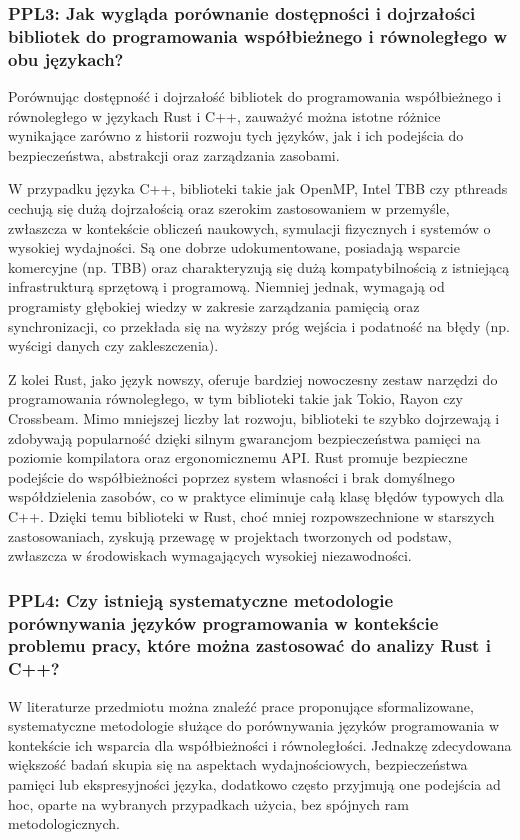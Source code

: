 \subsubsection{PPL3: Jak wygląda porównanie dostępności i dojrzałości bibliotek do programowania współbieżnego i równoległego w obu językach?}
Porównując dostępność i dojrzałość bibliotek do programowania współbieżnego i równoległego w językach Rust i C++, zauważyć można istotne różnice wynikające zarówno z historii rozwoju tych języków, jak i ich podejścia do bezpieczeństwa, abstrakcji oraz zarządzania zasobami.

W przypadku języka C++, biblioteki takie jak OpenMP, Intel TBB czy pthreads cechują się dużą dojrzałością oraz szerokim zastosowaniem w przemyśle, zwłaszcza w kontekście obliczeń naukowych, symulacji fizycznych i systemów o wysokiej wydajności. Są one dobrze udokumentowane, posiadają wsparcie komercyjne (np. TBB) oraz charakteryzują się dużą kompatybilnością z istniejącą infrastrukturą sprzętową i programową. Niemniej jednak, wymagają od programisty głębokiej wiedzy w zakresie zarządzania pamięcią oraz synchronizacji, co przekłada się na wyższy próg wejścia i podatność na błędy (np. wyścigi danych czy zakleszczenia).

Z kolei Rust, jako język nowszy, oferuje bardziej nowoczesny zestaw narzędzi do programowania równoległego, w tym biblioteki takie jak Tokio, Rayon czy Crossbeam. Mimo mniejszej liczby lat rozwoju, biblioteki te szybko dojrzewają i zdobywają popularność dzięki silnym gwarancjom bezpieczeństwa pamięci na poziomie kompilatora oraz ergonomicznemu API. Rust promuje bezpieczne podejście do współbieżności poprzez system własności  i brak domyślnego współdzielenia zasobów, co w praktyce eliminuje całą klasę błędów typowych dla C++. Dzięki temu biblioteki w Rust, choć mniej rozpowszechnione w starszych zastosowaniach, zyskują przewagę w projektach tworzonych od podstaw, zwłaszcza w środowiskach wymagających wysokiej niezawodności.

\subsubsection{PPL4: Czy istnieją systematyczne metodologie porównywania języków programowania w kontekście problemu pracy, które można zastosować do analizy Rust i C++?}

W literaturze przedmiotu można znaleźć prace proponujące sformalizowane, systematyczne metodologie służące do porównywania języków programowania w kontekście ich wsparcia dla współbieżności i równoległości. Jednakzę zdecydowana większość badań skupia się na aspektach wydajnościowych, bezpieczeństwa pamięci lub ekspresyjności języka, dodatkowo często przyjmują one podejścia ad hoc, oparte na wybranych przypadkach użycia, bez spójnych ram metodologicznych.


